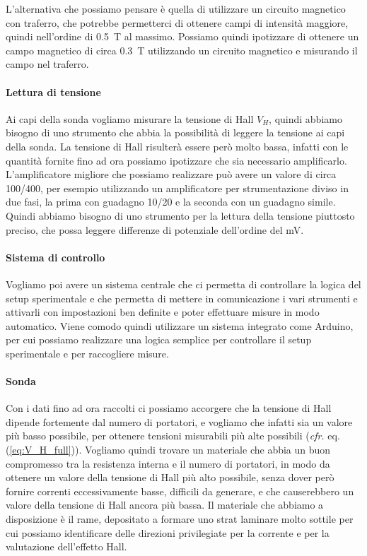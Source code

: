 \documentclass[fleqn,varvw,11pt,tightenlines]{memo}
\begin{document}
L'alternativa che possiamo pensare è quella di utilizzare un circuito magnetico con traferro, che potrebbe permetterci di ottenere campi di intensità maggiore, quindi nell'ordine di \SI{0.5}{\tesla} al massimo. Possiamo quindi ipotizzare di ottenere un campo magnetico di circa \SI{0.3}{\tesla} utilizzando un circuito magnetico e misurando il campo nel traferro.

\paragraph{Lettura di tensione} Ai capi della sonda vogliamo misurare la tensione di Hall $V_H$, quindi abbiamo bisogno di uno strumento che abbia la possibilità di leggere la tensione ai capi della sonda. La tensione di Hall risulterà essere però molto bassa, infatti con le quantità fornite fino ad ora possiamo ipotizzare che sia necessario amplificarlo. L'amplificatore migliore che possiamo realizzare può avere un valore di circa 100/400, per esempio utilizzando un amplificatore per strumentazione diviso in due fasi, la prima con guadagno 10/20 e la seconda con un guadagno simile. Quindi abbiamo bisogno di uno strumento per la lettura della tensione piuttosto preciso, che possa leggere differenze di potenziale dell'ordine del \si{\milli\volt}. 

\paragraph{Sistema di controllo} Vogliamo poi avere un sistema centrale che ci permetta di controllare la logica del setup sperimentale e che permetta di mettere in comunicazione i vari strumenti e attivarli con impostazioni ben definite e poter effettuare misure in modo automatico. Viene comodo quindi utilizzare un sistema integrato come Arduino, per cui possiamo realizzare una logica semplice per controllare il setup sperimentale e per raccogliere misure. 

\paragraph{Sonda} Con i dati fino ad ora raccolti ci possiamo accorgere che la tensione di Hall dipende fortemente dal numero di portatori, e vogliamo che infatti sia un valore più basso possibile, per ottenere tensioni misurabili più alte possibili (\emph{cfr.} eq. (\ref{eq:V_H_full})). Vogliamo quindi trovare un materiale che abbia un buon compromesso tra la resistenza interna e il numero di portatori, in modo da ottenere un valore della tensione di Hall più alto possibile, senza dover però fornire correnti eccessivamente basse, difficili da generare, e che causerebbero un valore della tensione di Hall ancora più bassa. Il materiale che abbiamo a disposizione è il rame, depositato a formare uno strat laminare molto sottile per cui possiamo identificare delle direzioni privilegiate per la corrente e per la valutazione dell'effetto Hall. 
\end{document}
